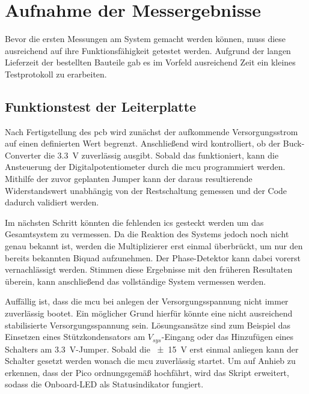 \documentclass[../main_config.tex]{subfiles}
\begin{document}
\chapter{Aufnahme der Messergebnisse}
Bevor die ersten Messungen am System gemacht werden können, muss diese ausreichend auf ihre Funktionsfähigkeit getestet werden. Aufgrund der langen Lieferzeit der bestellten Bauteile gab es im Vorfeld ausreichend Zeit ein kleines Testprotokoll zu erarbeiten.\par


\section{Funktionstest der Leiterplatte}
Nach Fertigstellung des \gls{pcb} wird zunächst der aufkommende Versorgungsstrom auf einen definierten Wert begrenzt. Anschließend wird kontrolliert, ob der Buck-Converter die \SI{3.3}{\volt} zuverlässig ausgibt. Sobald das funktioniert, kann die Ansteuerung der Digitalpotentiometer durch die \gls{mcu} programmiert werden. Mithilfe der zuvor geplanten Jumper kann der daraus resultierende Widerstandswert unabhängig von der Restschaltung gemessen und der Code dadurch validiert werden. \par
\medskip

Im nächsten Schritt könnten die fehlenden \glspl{ic} gesteckt werden um das Gesamtsystem zu vermessen. Da die Reaktion des Systems jedoch noch nicht genau bekannt ist, werden die Multiplizierer erst einmal überbrückt, um nur den bereits bekannten Biquad aufzunehmen. Der Phase-Detektor kann dabei vorerst vernachlässigt werden. Stimmen diese Ergebnisse mit den früheren Resultaten überein, kann anschließend das vollständige System vermessen werden. \par
\medskip

Auffällig ist, dass die \gls{mcu} bei anlegen der Versorgungsspannung nicht immer zuverlässig bootet. Ein möglicher Grund hierfür könnte eine nicht ausreichend stabilisierte Versorgungsspannung sein. Lösungsansätze sind zum Beispiel das Einsetzen eines Stützkondensators am $V_{sys}$-Eingang oder das Hinzufügen eines Schalters am \SI{3.3}{\volt}-Jumper. Sobald die \SI{\pm15}{\volt} erst einmal anliegen kann der Schalter gesetzt werden wonach die \gls{mcu} zuverlässig startet. Um auf Anhieb zu erkennen, dass der Pico ordnungsgemäß hochfährt, wird das Skript erweitert, sodass die Onboard-LED als Statusindikator fungiert.\par
\medskip
\end{document}
